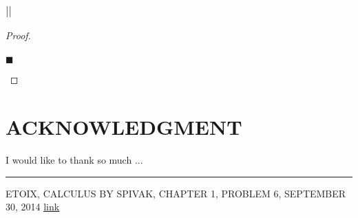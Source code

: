\documentclass[letterpaper, 10 pt, conference]{ieeeconf}  %
\begin{document}
\subsubsection{\textbf{$\left\lvert \right\rvert$}}
\begin{proof}
\begin{align}
    
\end{align}
\begin{flushright}
$\blacksquare$
\end{flushright}
\end{proof}

\newpage

\section*{ACKNOWLEDGMENT}
I would like to thank so much ...

\noindent\rule{8cm}{0.4pt}

\begin{thebibliography}{99}

 ETOIX, CALCULUS BY SPIVAK, CHAPTER 1, PROBLEM 6, SEPTEMBER 30, 2014 \href{https://etoix.wordpress.com/2014/09/30/calculus-by-spivak-chapter-1-problem-6/}{\underline{link}}
\end{thebibliography}
\end{document}
